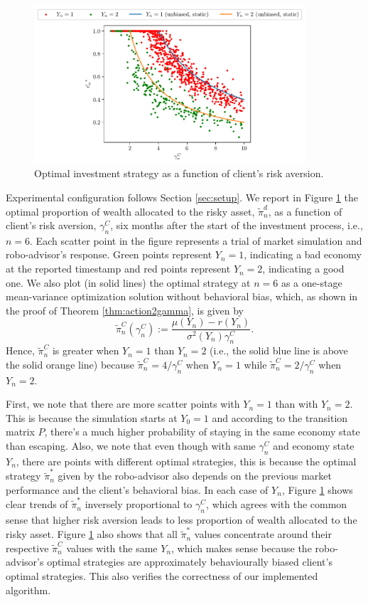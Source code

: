 \begin{figure}[t]
    \centering
    \includegraphics[width=0.9\textwidth]{imgs/optimal_strategy.pdf}
    \caption{Optimal investment strategy as a function of client's risk aversion.}
    \label{fig:opt}
\end{figure}

Experimental configuration follows Section \ref{sec:setup}. We report in Figure \ref{fig:opt} the optimal proportion of wealth allocated to the risky asset, $\tilde\pi_n^d$, as a function of client's risk aversion, $\gamma_n^C$, six months after the start of the investment process, i.e., $n=6$. Each scatter point in the figure represents a trial of market simulation and robo-advisor's response. Green points represent $Y_n=1$, indicating a bad economy at the reported timestamp and red points represent $Y_n=2$, indicating a good one. We also plot (in solid lines) the optimal strategy at $n=6$ as a one-stage mean-variance optimization solution without behavioral bias, which, as shown in the proof of Theorem \ref{thm:action2gamma}, is given by $$\tilde\pi_n^{C}(\gamma_n^C):=\frac{\mu(Y_n)-r(Y_n)}{\sigma^2(Y_n)\gamma_n^C}.$$ Hence, $\tilde\pi_n^C$ is greater when $Y_n=1$ than $Y_n=2$ (i.e., the solid blue line is above the solid orange line) because $\tilde\pi_n^C=4/\gamma_n^C$ when $Y_n=1$ while $\tilde\pi_n^C=2/\gamma_n^C$ when $Y_n=2$.

First, we note that there are more scatter points with $Y_n=1$ than with $Y_n=2$. This is because the simulation starts at $Y_0=1$ and according to the transition matrix $P$, there's a much higher probability of staying in the same economy state than escaping. Also, we note that even though with same $\gamma_n^C$ and economy state $Y_n$, there are points with different optimal strategies, this is because the optimal strategy $\tilde\pi_n^*$ given by the robo-advisor also depends on the previous market performance and the client's behavioral bias. In each case of $Y_n$, Figure \ref{fig:opt} shows clear trends of $\tilde\pi_n^*$ inversely proportional to $\gamma_n^C$, which agrees with the common sense that higher risk aversion leads to less proportion of wealth allocated to the risky asset. Figure \ref{fig:opt} also shows that all $\tilde\pi_n^*$ values concentrate around their respective $\tilde\pi_n^C$ values with the same $Y_n$, which makes sense because the robo-advisor's optimal strategies are approximately behaviourally biased client's optimal strategies. This also verifies the correctness of our implemented algorithm.

